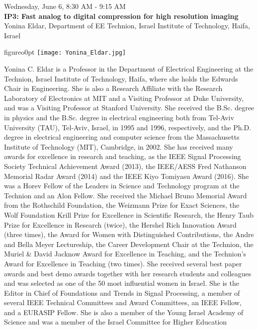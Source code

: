 \newpage\vspace{2cm}
\begin{center}{\Large{
Wednesday, June 6, 8:30 AM - 9:15 AM \\
\textbf{IP3: Fast analog to digital compression for high resolution imaging}\\
Yonina Eldar, Department of EE Technion, Israel Institute of Technology, Haifa, Israel
}}\end{center}
\vspace{1cm}


\begin{wrapfloat}{figure}{o}{0pt}
\texttt{[image: Yonina\_Eldar.jpg]}
\end{wrapfloat}
Yonina C. Eldar is a Professor in the Department of Electrical Engineering at the Technion, Israel Institute of Technology, Haifa, where she holds the Edwards Chair in Engineering. 
She is also a Research Affiliate with the Research Laboratory of Electronics at MIT and a Visiting Professor at Duke University, and was a Visiting Professor at Stanford University. 
She received the B.Sc. degree in physics and the B.Sc. degree in electrical engineering both from Tel-Aviv University (TAU), Tel-Aviv, Israel, in 1995 and 1996, respectively, and the Ph.D. degree in electrical engineering and computer science from the Massachusetts Institute of Technology (MIT), Cambridge, in 2002.
She has received many awards for excellence in research and teaching, as
the IEEE Signal Processing Society Technical Achievement Award (2013), the IEEE/AESS Fred Nathanson Memorial Radar Award (2014) and the IEEE Kiyo Tomiyasu Award (2016).
She was a Horev Fellow of the Leaders in Science and Technology program at the Technion and an Alon Fellow. 
She received the Michael Bruno Memorial Award from the Rothschild Foundation, the Weizmann Prize for Exact Sciences, the Wolf Foundation Krill Prize for Excellence in Scientific Research, the Henry Taub Prize for Excellence in Research (twice), the Hershel Rich Innovation Award (three times), the Award for Women with Distinguished Contributions, the Andre and Bella Meyer Lectureship, the Career Development Chair at the Technion, the Muriel \& David Jacknow Award for Excellence in Teaching, and the Technion's Award for Excellence in Teaching (two times). 
She received several best paper awards and best demo awards together with her research students and colleagues and was selected as one of the 50 most influential women in Israel.
She is the Editor in Chief of Foundations and Trends in Signal Processing, a member of several IEEE Technical Committees and Award Committees, an IEEE Fellow, and a EURASIP Fellow.
She is also a member of the Young Israel Academy of Science and was a member of the Israel Committee for Higher Education

